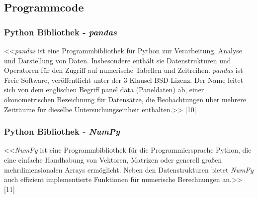 \begin{appendix}
\section{Programmcode}


\label{main_src}


\label{ldd_src}

\subsubsection{Python Bibliothek - \textit{pandas}}
<<\textit{pandas} ist eine Programmbibliothek für Python zur Verarbeitung, Analyse und Darstellung von Daten. Insbesondere enthält sie Datenstrukturen und Operatoren für den Zugriff auf numerische Tabellen und Zeitreihen. \textit{pandas} ist Freie Software, veröffentlicht unter der 3-Klausel-BSD-Lizenz. Der Name leitet sich von dem englischen Begriff panel data (Paneldaten) ab, einer ökonometrischen Bezeichnung für Datensätze, die Beobachtungen über mehrere Zeiträume für dieselbe Untersuchungseinheit enthalten.>> [10]

\subsubsection{Python Bibliothek - \textit{NumPy}}
<<\textit{NumPy} ist eine Programmbibliothek für die Programmiersprache Python, die eine einfache Handhabung von Vektoren, Matrizen oder generell großen mehrdimensionalen Arrays ermöglicht. Neben den Datenstrukturen bietet \textit{NumPy} auch effizient implementierte Funktionen für numerische Berechnungen an.>> [11]

\end{appendix}
